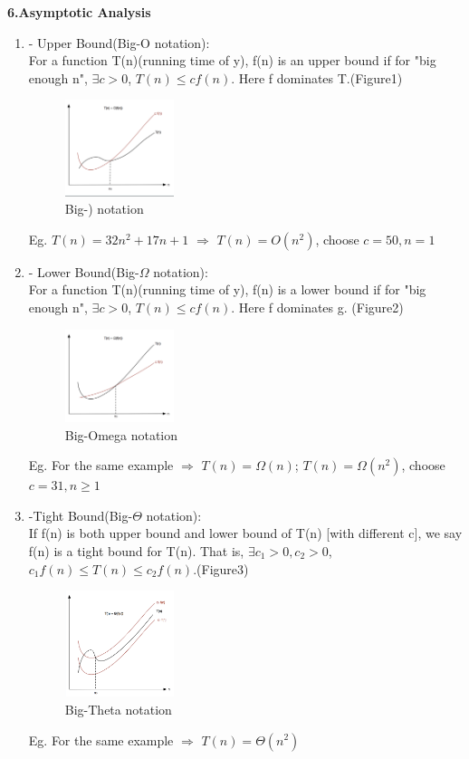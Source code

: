 \textbf{6.Asymptotic Analysis}
\begin{enumerate}
\item 
- Upper Bound(Big-O notation):\\
For a function T(n)(running time of y), f(n) is an upper bound if for "big enough n", $\exists c >0 $, $T(n) \leq cf(n)$. Here f dominates T.(Figure1)\\
\begin{figure}
\centering
\includegraphics[width=0.3\textwidth]{big-O.png}
\caption{\label{fig:big-O}Big-) notation}
\end{figure}
Eg. $T(n) = 32 n^{2} + 17n + 1$ $\Rightarrow$ $T(n) = O(n^{2})$, choose $ c=50, n= 1$ 
\item
- Lower Bound(Big-$\Omega$ notation):\\
For a function T(n)(running time of y), f(n) is a lower bound if for "big enough n", $\exists c >0 $, $T(n) \leq cf(n)$. Here f dominates g. (Figure2)\\
\begin{figure}
\centering
\includegraphics[width=0.3\textwidth]{big-Omega.png}
\caption{\label{fig:big-Omega}Big-Omega notation}
\end{figure}
Eg. For the same example $\Rightarrow$ $T(n)= \Omega(n)$; $T(n)= \Omega(n^{2})$, choose $c = 31, n \geq 1$ 
\item
-Tight Bound(Big-$\Theta$ notation):\\
If f(n) is both upper bound and lower bound of T(n) [with different c], we say f(n) is a tight bound for T(n). That is, $\exists c_{1} >0, c_{2}>0$, $ c_{1} f(n) \leq T(n) \leq c_{2}f(n)$.(Figure3)\\
\begin{figure}
\centering
\includegraphics[width=0.3\textwidth]{big-theta.png}
\caption{\label{fig:big-theta}Big-Theta notation}
\end{figure}
Eg. For the same example $\Rightarrow$ $T(n)= \Theta(n^{2})$
\end{enumerate}

